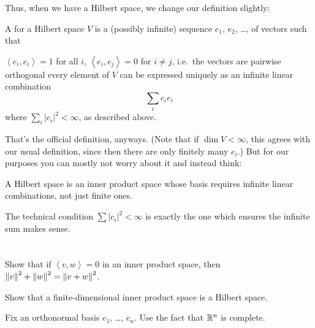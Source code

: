 Thus, when we have a Hilbert space, we change our definition slightly:
\begin{definition}
	A  for a Hilbert space $V$
	is a (possibly infinite) sequence $e_1$, $e_2$, \dots,
	of vectors such that
	\begin{itemize}
		\ii $\left< e_i, e_i \right> = 1$ for all $i$,
		\ii $\left< e_i, e_j \right> = 0$ for $i \ne j$,
		i.e.\ the vectors are pairwise orthogonal
		\ii every element of $V$ can be expressed uniquely as an
		infinite linear combination
		\[ \sum_i c_i e_i \]
		where $\sum_i \left\lvert c_i \right\rvert^2 < \infty$,
		as described above.
	\end{itemize}
\end{definition}
That's the official definition, anyways.
(Note that if $\dim V < \infty$, this agrees with our usual definition,
since then there are only finitely many $e_i$.)
But for our purposes you can mostly not worry about it and instead think:
\begin{moral}
	A Hilbert space is an inner product space
	whose basis requires infinite linear combinations,
	not just finite ones.
\end{moral}
The technical condition $\sum \left\lvert c_i \right\rvert^2 < \infty$
is exactly the one which ensures the infinite sum makes sense.

\section{\problemhead}

\begin{problem}
	Show that if $\left< v,w \right> = 0$ in an inner product space,
	then $\left\lVert v \right\rVert^2 + \left\lVert w \right\rVert^2 = \left\lVert v+w \right\rVert^2$.
\end{problem}

\begin{sproblem}
	Show that a finite-dimensional inner product space
	is a Hilbert space.
	\begin{hint}
		Fix an orthonormal basis $e_1$, \dots, $e_n$.
		Use the fact that $\mathbb R^n$ is complete.
	\end{hint}
\end{sproblem}


